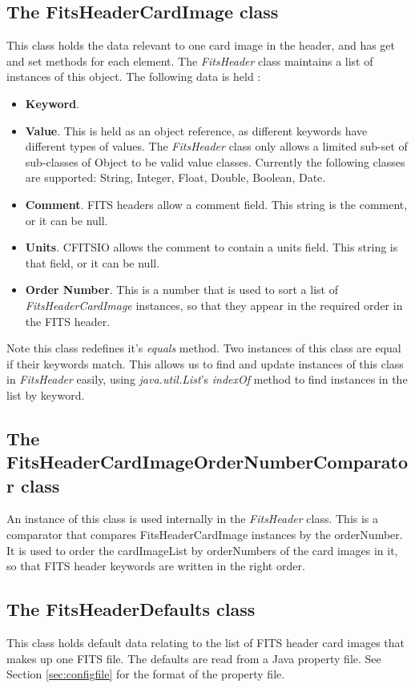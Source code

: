 \documentclass[10pt,a4paper]{article}
\begin{document}
\subsection{The FitsHeaderCardImage class}
This class holds the data relevant to one card image in the header, and has get and set methods for each
element. The {\em FitsHeader} class maintains a list of instances of this object. The following data
is held :
\begin{itemize}
\item {\bf Keyword}.
\item {\bf Value}. This is held as an object reference, as different keywords have different types of values.
	The {\em FitsHeader} class only allows a limited sub-set of sub-classes of Object to be valid value classes.
	Currently the following classes are supported: String, Integer, Float, Double, Boolean, Date.
\item {\bf Comment}. FITS headers allow a comment field. This string is the comment, or it can be null.
\item {\bf Units}. CFITSIO allows the comment to contain a units field. This string is that field, or it can
	be null.
\item {\bf Order Number}. This is a number that is used to sort a list of {\em FitsHeaderCardImage} instances,
	so that they appear in the required order in the FITS header.
\end{itemize}

Note this class redefines it's {\em equals} method. Two instances of this class are equal if their
keywords match. This allows us to find and update instances of this class in {\em FitsHeader} easily,
using {\em java.util.List}'s {\em indexOf} method to find instances in the list by keyword.

\subsection{The FitsHeaderCardImageOrderNumberComparator class}
An instance of this class is used internally in the {\em FitsHeader} class. This is a comparator that
compares FitsHeaderCardImage instances by the orderNumber. It is used to
order the cardImageList by orderNumbers of the card images in it, so that
FITS header keywords are written in the right order.

\subsection{The FitsHeaderDefaults class}
\label{sec:fitsheaderdefaultsclass}
This class holds default data relating to the list of FITS header card images that makes up one FITS file. 
The defaults are read from a Java property file. See Section \ref{sec:configfile} for the format of the 
property file. 
\end{document}
